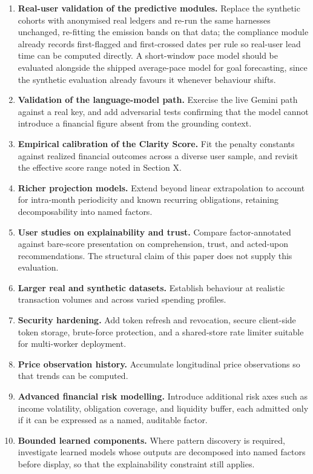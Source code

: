 \documentclass[conference]{IEEEtran}
\begin{document}
\begin{enumerate}
\item \textbf{Real-user validation of the predictive modules.} Replace the synthetic cohorts with anonymised real ledgers and re-run the same harnesses unchanged, re-fitting the emission bands on that data; the compliance module already records first-flagged and first-crossed dates per rule so real-user lead time can be computed directly. A short-window pace model should be evaluated alongside the shipped average-pace model for goal forecasting, since the synthetic evaluation already favours it whenever behaviour shifts.
\item \textbf{Validation of the language-model path.} Exercise the live Gemini path against a real key, and add adversarial tests confirming that the model cannot introduce a financial figure absent from the grounding context.
\item \textbf{Empirical calibration of the Clarity Score.} Fit the penalty constants against realized financial outcomes across a diverse user sample, and revisit the effective score range noted in Section X.
\item \textbf{Richer projection models.} Extend beyond linear extrapolation to account for intra-month periodicity and known recurring obligations, retaining decomposability into named factors.
\item \textbf{User studies on explainability and trust.} Compare factor-annotated against bare-score presentation on comprehension, trust, and acted-upon recommendations. The structural claim of this paper does not supply this evaluation.
\item \textbf{Larger real and synthetic datasets.} Establish behaviour at realistic transaction volumes and across varied spending profiles.
\item \textbf{Security hardening.} Add token refresh and revocation, secure client-side token storage, brute-force protection, and a shared-store rate limiter suitable for multi-worker deployment.
\item \textbf{Price observation history.} Accumulate longitudinal price observations so that trends can be computed.
\item \textbf{Advanced financial risk modelling.} Introduce additional risk axes such as income volatility, obligation coverage, and liquidity buffer, each admitted only if it can be expressed as a named, auditable factor.
\item \textbf{Bounded learned components.} Where pattern discovery is required, investigate learned models whose outputs are decomposed into named factors before display, so that the explainability constraint still applies.
\end{enumerate}
\end{document}
